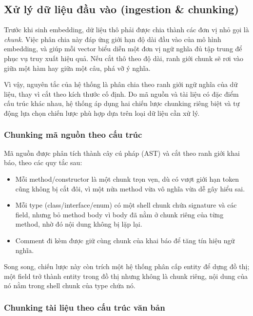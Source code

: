 \subsection{Xử lý dữ liệu đầu vào (ingestion \& chunking)}

Trước khi sinh embedding, dữ liệu thô phải được chia thành các đơn vị nhỏ gọi là \textit{chunk}. Việc phân chia này đáp ứng giới hạn độ dài đầu vào của mô hình embedding, và giúp mỗi vector biểu diễn một đơn vị ngữ nghĩa đủ tập trung để phục vụ truy xuất hiệu quả. Nếu cắt thô theo độ dài, ranh giới chunk sẽ rơi vào giữa một hàm hay giữa một câu, phá vỡ ý nghĩa. 

Vì vậy, nguyên tắc của hệ thống là phân chia theo ranh giới ngữ nghĩa của dữ liệu, thay vì cắt theo kích thước cố định. Do mã nguồn và tài liệu có đặc điểm cấu trúc khác nhau, hệ thống áp dụng hai chiến lược chunking riêng biệt và tự động lựa chọn chiến lược phù hợp dựa trên loại dữ liệu cần xử lý.

\subsubsection{Chunking mã nguồn theo cấu trúc}

Mã nguồn được phân tích thành cây cú pháp (AST) và cắt theo ranh giới khai báo, theo các quy tắc sau:

\begin{itemize}
  \item Mỗi method/constructor là một chunk trọn vẹn, dù có vượt giới hạn token cũng không bị cắt đôi, vì một nửa method vừa vô nghĩa vừa dễ gây hiểu sai.
  \item Mỗi type (class/interface/enum) có một shell chunk chứa signature và các field, nhưng bỏ method body vì body đã nằm ở chunk riêng của từng method, nhờ đó nội dung không bị lặp lại.
  \item Comment đi kèm được giữ cùng chunk của khai báo để tăng tín hiệu ngữ nghĩa.
\end{itemize}

Song song, chiến lược này còn trích một hệ thống phân cấp entity để dựng đồ thị; một field trở thành entity trong đồ thị nhưng không là chunk riêng, nội dung của nó nằm trong shell chunk của type chứa nó.

\subsubsection{Chunking tài liệu theo cấu trúc văn bản}


